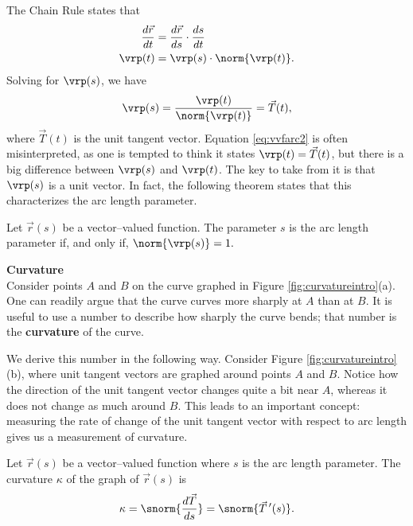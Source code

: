 The Chain Rule states that 
\begin{align*}
\frac{d\vec r}{dt} &= \frac{d\vec r}{ds}\cdot\frac{ds}{dt}\\
\vrp(t) &= \vrp(s)\cdot \norm{\vrp(t)}.
\end{align*}
Solving for $\vrp(s)$, we have 
\begin{equation}
\vrp(s) = \frac{\vrp(t)}{\norm{\vrp(t)}} = \vec T(t),\label{eq:vvfarc2}
\end{equation}
where $\vec T(t)$ is the unit tangent vector. Equation \ref{eq:vvfarc2} is often misinterpreted, as one is tempted to think it states $\vrp(t) = \vec T(t)$, but there is a big difference between $\vrp(s)$ and $\vrp(t)$. The key to take from it is that $\vrp(s)$ is a unit vector. In fact, the following theorem states that this characterizes the arc length parameter.

{Let $\vec r(s)$ be a vector--valued function. The parameter $s$ is the arc length parameter if, and only if, $\norm{\vrp(s)} = 1.$
}

\noindent\textbf{\large Curvature}\\

Consider points $A$ and $B$ on the curve graphed in Figure \ref{fig:curvatureintro}(a). One can readily argue that the curve curves more sharply at $A$ than at $B$. It is useful to use a number to describe how sharply the curve bends; that number is the \textbf{curvature} of the curve.

We derive this number in the following way. Consider Figure \ref{fig:curvatureintro}(b), where  unit tangent vectors are graphed around points $A$ and $B$. Notice how the direction of the unit tangent vector changes quite a bit near $A$, whereas it does not change as much around $B$. This leads to an important concept: measuring the rate of change of the unit tangent vector with respect to arc length gives us a measurement of curvature.

{Let $\vec r(s)$ be a vector--valued function where $s$ is the arc length parameter. The curvature $\kappa$ of the graph of $\vec r(s)$ is
$$\kappa = \snorm{\frac{d\vec T}{ds}} = \snorm{\vec T\,'(s)}.$$
}\\

